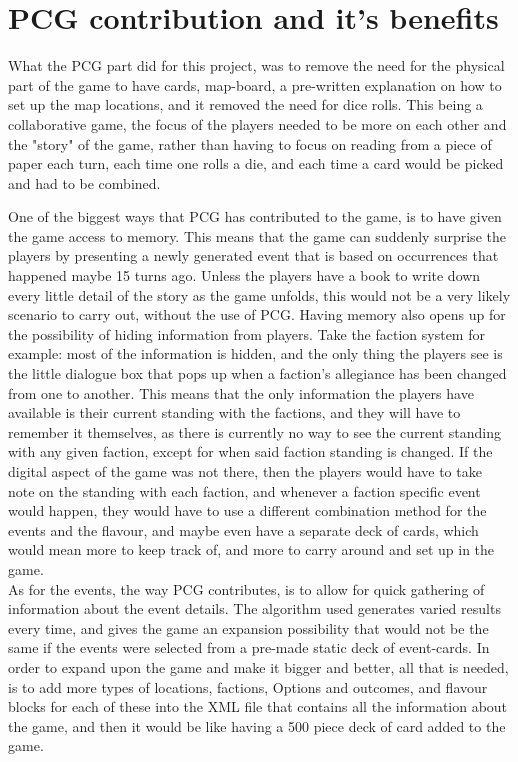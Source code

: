 \section{PCG contribution and it's benefits}
What the PCG part did for this project, was to remove the need for the physical part of the game to have cards, map-board, a pre-written explanation on how to set up the map locations, and it removed the need for dice rolls. This being a collaborative game, the focus of the players needed to be more on each other and the "story" of the game, rather than having to focus on reading from a piece of paper each turn, each time one rolls a die, and each time a card would be picked and had to be combined.

One of the biggest ways that PCG has contributed to the game, is to have given the game access to memory. This means that the game can suddenly surprise the players by presenting a newly generated event that is based on occurrences that happened maybe 15 turns ago. Unless the players have a book to write down every little detail of the story as the game unfolds, this would not be a very likely scenario to carry out, without the use of PCG. 
Having memory also opens up for the possibility of hiding information from players. Take the faction system for example: most of the information is hidden, and the only thing the players see is the little dialogue box that pops up when a faction's allegiance has been changed from one to another. This means that the only information the players have available is their current standing with the factions, and they will have to remember it themselves, as there is currently no way to see the current standing with any given faction, except for when said faction standing is changed. If the digital aspect of the game was not there, then the players would have to take note on the standing with each faction, and whenever a faction specific event would happen, they would have to use a different combination method for the events and the flavour, and maybe even have a separate deck of cards, which would mean more to keep track of, and more to carry around and set up in the game.\\
As for the events, the way PCG contributes, is to allow for quick gathering of information about the event details. The algorithm used generates varied results every time, and gives the game an expansion possibility that would not be the same if the events were selected from a pre-made static deck of event-cards. In order to expand upon the game and make it bigger and better, all that is needed, is to add more types of locations, factions, Options and outcomes, and flavour blocks for each of these into the XML file that contains all the information about the game, and then it would be like having a 500 piece deck of card added to the game.\\
